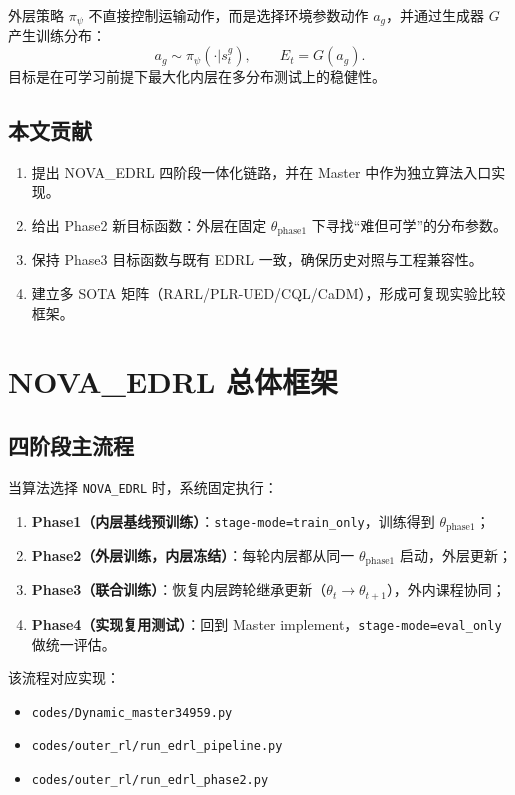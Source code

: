 \documentclass[UTF8,11pt,a4paper]{ctexart}
\begin{document}
外层策略 \(\pi_\psi\) 不直接控制运输动作，而是选择环境参数动作 \(a_g\)，并通过生成器 \(G\) 产生训练分布：
\begin{equation}
a_g \sim \pi_\psi(\cdot|s_t^g), \qquad E_t = G(a_g).
\end{equation}
目标是在可学习前提下最大化内层在多分布测试上的稳健性。

\subsection{本文贡献}
\begin{enumerate}
\item 提出 NOVA\_EDRL 四阶段一体化链路，并在 Master 中作为独立算法入口实现。
\item 给出 Phase2 新目标函数：外层在固定 \(\theta_{\text{phase1}}\) 下寻找“难但可学”的分布参数。
\item 保持 Phase3 目标函数与既有 EDRL 一致，确保历史对照与工程兼容性。
\item 建立多 SOTA 矩阵（RARL/PLR-UED/CQL/CaDM），形成可复现实验比较框架。
\end{enumerate}

\section{NOVA\_EDRL 总体框架}
\subsection{四阶段主流程}
当算法选择 \texttt{NOVA\_EDRL} 时，系统固定执行：
\begin{enumerate}
\item \textbf{Phase1（内层基线预训练）}：\texttt{stage-mode=train\_only}，训练得到 \(\theta_{\text{phase1}}\)；
\item \textbf{Phase2（外层训练，内层冻结）}：每轮内层都从同一 \(\theta_{\text{phase1}}\) 启动，外层更新；
\item \textbf{Phase3（联合训练）}：恢复内层跨轮继承更新（\(\theta_t\rightarrow\theta_{t+1}\)），外内课程协同；
\item \textbf{Phase4（实现复用测试）}：回到 Master implement，\texttt{stage-mode=eval\_only} 做统一评估。
\end{enumerate}

该流程对应实现：
\begin{itemize}
\item \texttt{codes/Dynamic\_master34959.py}
\item \texttt{codes/outer\_rl/run\_edrl\_pipeline.py}
\item \texttt{codes/outer\_rl/run\_edrl\_phase2.py}
\end{itemize}
\end{document}

